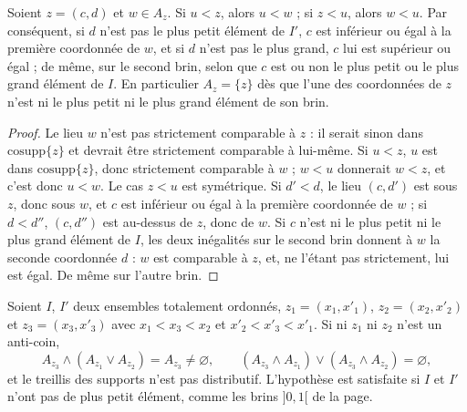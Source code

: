 \begin{lemme}\label{lem:156-7-position}
Soient $z = (c, d)$ et $w \in A_z$. Si $u < z$, alors $u < w$ ; si $z < u$, alors $w < u$. Par conséquent, si $d$ n'est pas le plus petit élément de $I'$, $c$ est inférieur ou égal à la première coordonnée de $w$, et si $d$ n'est pas le plus grand, $c$ lui est supérieur ou égal ; de même, sur le second brin, selon que $c$ est ou non le plus petit ou le plus grand élément de $I$. En particulier $A_z = \{z\}$ dès que l'une des coordonnées de $z$ n'est ni le plus petit ni le plus grand élément de son brin.
\end{lemme}

\begin{proof}
Le lieu $w$ n'est pas strictement comparable à $z$ : il serait sinon dans $\mathrm{cosupp}\{z\}$ et devrait être strictement comparable à lui-même. Si $u < z$, $u$ est dans $\mathrm{cosupp}\{z\}$, donc strictement comparable à $w$ ; $w < u$ donnerait $w < z$, et c'est donc $u < w$. Le cas $z < u$ est symétrique. Si $d' < d$, le lieu $(c, d')$ est sous $z$, donc sous $w$, et $c$ est inférieur ou égal à la première coordonnée de $w$ ; si $d < d''$, $(c, d'')$ est au-dessus de $z$, donc de $w$. Si $c$ n'est ni le plus petit ni le plus grand élément de $I$, les deux inégalités sur le second brin donnent à $w$ la seconde coordonnée $d$ : $w$ est comparable à $z$, et, ne l'étant pas strictement, lui est égal. De même sur l'autre brin.
\end{proof}

\begin{encadre}
\begin{theoreme}\label{thm:156-7-supports}
Soient $I$, $I'$ deux ensembles totalement ordonnés, $z_1 = (x_1, x'_1)$, $z_2 = (x_2, x'_2)$ et $z_3 = (x_3, x'_3)$ avec $x_1 < x_3 < x_2$ et $x'_2 < x'_3 < x'_1$. Si ni $z_1$ ni $z_2$ n'est un anti-coin,
\[
A_{z_3} \wedge (A_{z_1} \vee A_{z_2}) = A_{z_3} \neq \varnothing , \qquad (A_{z_3} \wedge A_{z_1}) \vee (A_{z_3} \wedge A_{z_2}) = \varnothing ,
\]
et le treillis des supports n'est pas distributif. L'hypothèse est satisfaite si $I$ et $I'$ n'ont pas de plus petit élément, comme les brins $]0, 1[$ de la page.
\end{theoreme}
\end{encadre}

